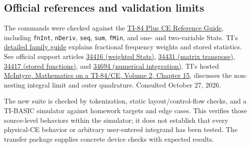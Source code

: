 \subsection{Official references and validation limits}
The commands were checked against the \href{https://education.ti.com/download/en/ed-tech/0E32ECD55D084B2EAE7632510BC25FC0/4C0D8E4ED84C4182BC94F8375DEC4E0A/TI84_Plus_CE_ReferenceGuide_EN_GB.pdf}{TI-84 Plus CE Reference Guide}, including \texttt{fnInt}, \texttt{nDeriv}, \texttt{seq}, \texttt{sum}, \texttt{fMin}, and one- and two-variable Stats. TI's \href{https://education.ti.com/download/en/ed-tech/1743A58846484D5C9C6E1525B2548EED/FE52ED11600F49ACBDEF6108BD98C99C/TI-84Plus_C_Guidebook_EN.pdf}{detailed family guide} explains fractional frequency weights and stored statistics. See official support articles \href{https://education.ti.com/en/customer-support/knowledge-base/ti-83-84-plus-family/product-usage/34416}{34416 (weighted Stats)}, \href{https://education.ti.com/en/customer-support/knowledge-base/ti-83-84-plus-family/product-usage/34431}{34431 (matrix transpose)}, \href{https://education.ti.com/en/customer-support/knowledge-base/ti-83-84-plus-family/product-usage/34417}{34417 (stored functions)}, and \href{https://education.ti.com/en/customer-support/knowledge-base/ti-83-84-plus-family/product-usage/34694}{34694 (numerical integration)}. TI's hosted \href{https://education.ti.com/seniornspiredcurriculum/aus-nz/-/media/ti/files/aus-nz/downloads/pdf/tibookvol_2.pdf}{McIntyre, Mathematics on a TI-84/CE, Volume 2, Chapter 15}, discusses the non-nesting integral limit and outer quadrature. Consulted October 27, 2026.

The new suite is checked by tokenization, static layout/control-flow checks, and a TI-BASIC simulator against homework targets and edge cases. This verifies those source-level behaviors within the simulator; it does not establish that every physical-CE behavior or arbitrary user-entered integrand has been tested. The transfer package supplies concrete device checks with expected results.
